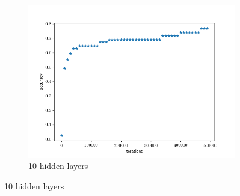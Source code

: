 \begin{figure}[H]
\centering
\begin{subfigure}[b]{.45\linewidth}
\includegraphics[width=\linewidth]{img/tests/40ppl/k=27,h=10,50000epoch/res.png}
\caption{10 hidden layers}
\end{subfigure}


\end{figure}
